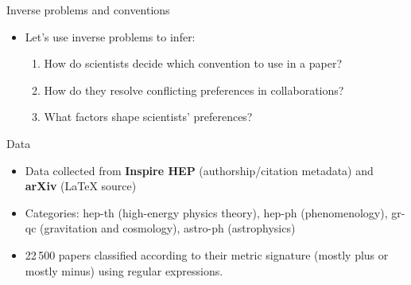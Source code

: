 \documentclass[10pt]{beamer}
\begin{document}
\begin{frame}{Inverse problems and conventions}
    \begin{itemize}
        \item<1-> Let's use inverse problems to infer:
        \begin{enumerate}
            \item<2-> How do scientists decide which convention to use in a paper?
            \item<3-> How do they resolve conflicting preferences in collaborations?
            \item<4-> What factors shape scientists' preferences?
        \end{enumerate}
    \end{itemize}
\end{frame}

\begin{frame}{Data}
    \begin{itemize}
        \item Data collected from \textbf{Inspire HEP} (authorship/citation metadata) and \textbf{arXiv} (LaTeX source)
        \item Categories: hep-th (high-energy physics theory), hep-ph (phenomenology), gr-qc (gravitation and cosmology), astro-ph (astrophysics)
        \item 22\,500 papers classified according to their metric signature (mostly plus or mostly minus) using regular expressions.
    \end{itemize}
\end{frame}


\end{document}
